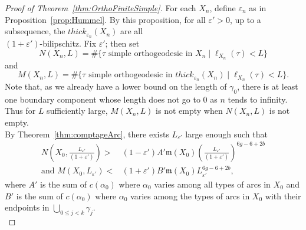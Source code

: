 \documentclass[a4paper,12pt]{article}
\theoremstyle{definition}
\theoremstyle{remark}
\begin{document}
\begin{proof}[Proof of Theorem~\ref{thm:OrthoFiniteSimple}]
    For each $X_n$, define $\varepsilon_n$ as in Proposition~\ref{prop:Hummel}. By this proposition, for all $\varepsilon'>0$, up to a subsequence, the $thick_{\varepsilon_n}(X_n)$ are all \\
    $(1+\varepsilon')$-bilipschitz. Fix $\varepsilon'$; then set
    \[
        N(X_n,L)= \# \{ \tau \mbox{ simple orthogeodesic in } X_n \mid \ell_{X_n}(\tau) < L \}
    \]
    and
    \[
        M(X_n,L) = \# \{ \tau \mbox{ simple orthogeodesic in } thick_{\varepsilon_n}(X_n) \mid \ell_{X_n}(\tau) < L \}.
    \]
    Note that, as we already have a lower bound on the length of $\gamma_0$, there is at least one boundary component whose length does not go to $0$ as $n$ tends to infinity. Thus for $L$ sufficiently large, $M(X_n,L)$ is not empty when $N(X_n,L)$ is not empty.\\
    
    By Theorem~\ref{thm:comptageArc}, there exists $L_{\varepsilon'}$ large enough such that
    \begin{align}
        N \left( X_0,\frac{L_{\varepsilon'}}{(1+\varepsilon')} \right) > & (1-\varepsilon')A'\mathfrak{m}(X_0)\left( \frac{L_{\varepsilon'}}{(1+\varepsilon')} \right)^{6g-6+2b} \label{rel:comptage1} \\
       \mbox{and } M \left( X_0,L_{\varepsilon'} \right) < & (1+\varepsilon')B'\mathfrak{m}(X_0) L_{\varepsilon'} ^{6g-6+2b}, \label{rel:comptage2}
    \end{align}
    where $A'$ is the sum of $c(\alpha_0)$ where $\alpha_0$ varies among all types of arcs in $X_0$ and $B'$ is the sum of $c(\alpha_0)$ where $\alpha_0$ varies among the types of arcs in $X_0$ with their endpoints in $\bigcup_{0 \leqslant j < k}\gamma_j$.\\
    

\end{proof}
\end{document}
